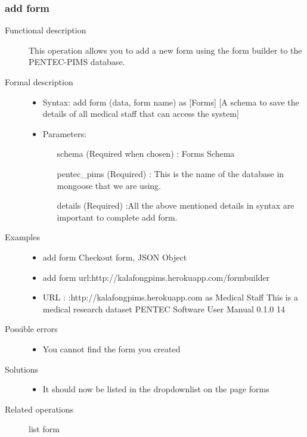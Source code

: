 \documentclass[a4paper]{article}
\begin{document}
	  
\subsubsection{add form}
\begin{description}
\item[Functional description] This operation allows you to add a new form using the form builder to the PENTEC-PIMS database.
\item [Formal description]\hfill
\begin{itemize}
	\item Syntax: add form (data, form name) as [Forms] [A schema to save the details of all medical staff that can access the system]\\
	\item Parameters:
	\begin{itemize}
		\item [schema] (Required when chosen) : Forms Schema
		\item [pentec\_pims] (Required) : This is the name of the database in mongoose that we are using.
		\item [details] (Required) :All the above mentioned details in syntax are important to complete add form.
	\end{itemize}
\end{itemize}
\item[Examples]\hfill
\begin{itemize}
	\item add form Checkout form, JSON Object
	\item add form url:http://kalafongpims.herokuapp.com/formbuilder
	\item URL : :http://kalafongpims.herokuapp.com as Medical Staff This is a medical research dataset
	PENTEC Software User Manual 0.1.0 14
\end{itemize}

\item[Possible errors]\hfill
\begin{itemize}
	\item You cannot find the form you created
\end{itemize}

\item[Solutions]\hfill
\begin{itemize}
	\item It should now be listed in the dropdownlist on the page forms
\end{itemize}
\item[Related operations] list form
\end{description}
	      
\end{document}
